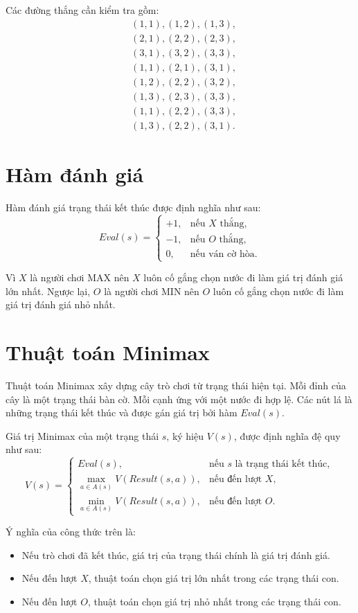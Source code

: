 \documentclass[12pt,a4paper]{article}
\begin{document}
Các đường thắng cần kiểm tra gồm:
\[
\begin{aligned}
&(1,1),(1,2),(1,3),\\
&(2,1),(2,2),(2,3),\\
&(3,1),(3,2),(3,3),\\
&(1,1),(2,1),(3,1),\\
&(1,2),(2,2),(3,2),\\
&(1,3),(2,3),(3,3),\\
&(1,1),(2,2),(3,3),\\
&(1,3),(2,2),(3,1).
\end{aligned}
\]

\section{Hàm đánh giá}

Hàm đánh giá trạng thái kết thúc được định nghĩa như sau:
\[
Eval(s)=
\begin{cases}
+1, & \text{nếu } X \text{ thắng},\\
-1, & \text{nếu } O \text{ thắng},\\
0, & \text{nếu ván cờ hòa}.
\end{cases}
\]

Vì $X$ là người chơi MAX nên $X$ luôn cố gắng chọn nước đi làm giá trị đánh giá lớn nhất.
Ngược lại, $O$ là người chơi MIN nên $O$ luôn cố gắng chọn nước đi làm giá trị đánh giá nhỏ nhất.

\section{Thuật toán Minimax}

Thuật toán Minimax xây dựng cây trò chơi từ trạng thái hiện tại.
Mỗi đỉnh của cây là một trạng thái bàn cờ.
Mỗi cạnh ứng với một nước đi hợp lệ.
Các nút lá là những trạng thái kết thúc và được gán giá trị bởi hàm $Eval(s)$.

Giá trị Minimax của một trạng thái $s$, ký hiệu $V(s)$, được định nghĩa đệ quy như sau:
\[
V(s)=
\begin{cases}
Eval(s), & \text{nếu } s \text{ là trạng thái kết thúc},\\
\max\limits_{a \in A(s)} V(Result(s,a)), & \text{nếu đến lượt } X,\\
\min\limits_{a \in A(s)} V(Result(s,a)), & \text{nếu đến lượt } O.
\end{cases}
\]

Ý nghĩa của công thức trên là:
\begin{itemize}
    \item Nếu trò chơi đã kết thúc, giá trị của trạng thái chính là giá trị đánh giá.
    \item Nếu đến lượt $X$, thuật toán chọn giá trị lớn nhất trong các trạng thái con.
    \item Nếu đến lượt $O$, thuật toán chọn giá trị nhỏ nhất trong các trạng thái con.
\end{itemize}
\end{document}
